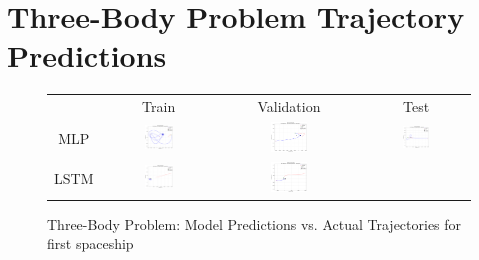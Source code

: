 \documentclass[11pt,a4paper, twocolumn]{article}
\begin{document}
\section{Three-Body Problem Trajectory Predictions}
\label{sec:three_body_predictions}
\begin{figure}[H]
  \centering
  \caption{Three-Body Problem: Model Predictions vs. Actual Trajectories for first spaceship}
  \label{fig:three_body_predictions}
  \begin{tabular}{cccc}
      & Train & Validation & Test \\
      MLP &
      \includegraphics[width=0.27\textwidth]{../inference_results/train/MLP/three_body/500/full_trajectory_spaceship_0.png} &
      \includegraphics[width=0.27\textwidth]{../inference_results/val/MLP/three_body/500/full_trajectory_spaceship_0.png} &
      \includegraphics[width=0.27\textwidth]{../inference_results/test/MLP/three_body/500/full_trajectory_spaceship_0.png} \\
      LSTM &
      \includegraphics[width=0.27\textwidth]{../inference_results/train/LSTM/three_body/500/full_trajectory_spaceship_0.png} &
      \includegraphics[width=0.27\textwidth]{../inference_results/val/LSTM/three_body/500/full_trajectory_spaceship_0.png} &

\end{tabular}
\end{figure}
\end{document}
